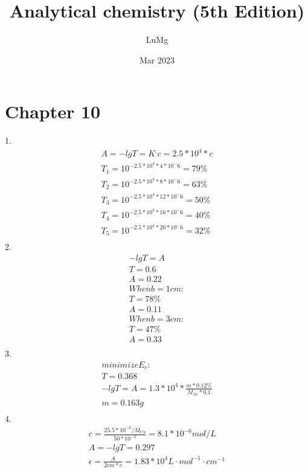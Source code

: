 \documentclass{article}
\title{Analytical chemistry (5th Edition)}
\author{LuMg}
\date{Mar 2023}
\begin{document}
\maketitle

\section{Chapter 10}
1.\begin{equation}
    \begin{multlined}
        A = -lgT = K^{,}c = 2.5*10^4*c\\
        T_1 = 10^{-2.5*10^4*4*10^-6} = 79\%\\
        T_2 = 10^{-2.5*10^4*8*10^-6} = 63\%\\
        T_3 = 10^{-2.5*10^4*12*10^-6} = 50\%\\
        T_4 = 10^{-2.5*10^4*16*10^-6} = 40\%\\
        T_5 = 10^{-2.5*10^4*20*10^-6} = 32\%\\
    \end{multlined}
\end{equation}
2.\begin{equation}
    \begin{multlined}
        -lgT = A\\
        T = 0.6\\
        A = 0.22\\
        When b = 1cm:\\
        T = 78\%\\
        A = 0.11\\
        When b = 3cm:\\
        T = 47\%\\
        A = 0.33\\
    \end{multlined}
\end{equation}
3.\begin{equation}
    \begin{multlined}
        minimize E_r:\\
        T = 0.368\\
        -lgT = A = 1.3*10^4*\frac{m*0.12\%}{M_{Ni}*0.1}\\
        m = 0.163g\\
    \end{multlined}
\end{equation}
4.\begin{equation}
    \begin{multlined}
        c = \frac{25.5*10^{-6}/M_{Cu}}{50*10^{-3}} = 8.1*10^{-6} mol/L\\
        A = -lgT = 0.297\\
        \epsilon = \frac{A}{2cm*c} = 1.83*10^4 L\cdot mol^{-1}\cdot cm^{-1}\\
    \end{multlined}
\end{equation}
\end{document}
